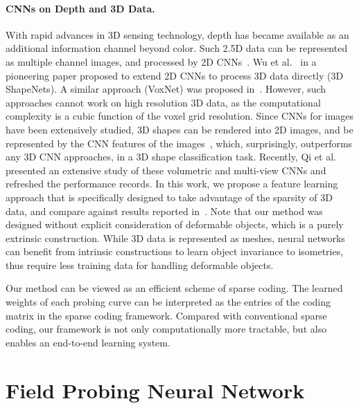 \documentclass{article}
\begin{document}
\paragraph{CNNs on Depth and 3D Data.} With rapid advances in 3D sensing technology, depth has became available as an additional information channel beyond color. Such 2.5D data can be represented as multiple channel images, and processed by 2D CNNs~\cite{Socher_NIPS12_Convolutional,Gupta_ECCV14_Learning,Eitel_IROS15_Multimodal}. Wu et al.~\cite{WU_CVPR15_3D} in a pioneering paper proposed to extend 2D CNNs to process 3D data directly (3D ShapeNets).
A similar approach (VoxNet) was proposed in~\cite{Maturana_IROS15_VoxNet}. However, such approaches cannot work on high resolution 3D data, as the computational complexity is a cubic function of the voxel grid resolution. Since CNNs for images have been extensively studied, 3D shapes can be rendered into 2D images, and be represented by the CNN features of the images~\cite{Shi_SPL15_DeepPano,Su_ICCV15_Multi}, which, surprisingly, outperforms any 3D CNN approaches, in a 3D shape classification task. Recently, Qi et al.~\cite{qi2016volumetric} presented an extensive study of these volumetric and multi-view CNNs and refreshed the performance records. In this work, we propose a feature learning approach that is specifically designed to take advantage of the sparsity of 3D data, and compare against results reported in~\cite{qi2016volumetric}. Note that our method was designed without explicit consideration of deformable objects, which is a purely extrinsic construction. While 3D data is represented as meshes, neural networks can benefit from intrinsic constructions\cite{litman2014learning,masci2015geodesic,Boscaini_SGP15_Learning,boscaini2016anisotropic} to learn object invariance to isometries, thus require less training data for handling deformable objects.

Our method can be viewed as an efficient scheme of sparse coding\cite{donoho2006compressed}. The learned weights of each probing curve can be interpreted as the entries of the coding matrix in the sparse coding framework. Compared with conventional sparse coding, our framework is not only computationally more tractable, but also enables an end-to-end learning system. \vspace{-0.3cm}
\section{Field Probing Neural Network}
\label{sec:fpnn}
\end{document}
